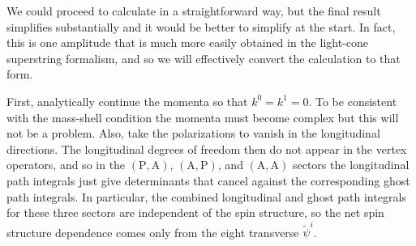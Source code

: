 We could proceed to calculate in a straightforward way, but the final result simplifies substantially and it would be better to simplify at the start. In fact, this is one amplitude that is much more easily obtained in the light-cone superstring formalism, and so we will effectively convert the calculation to that form.

First, analytically continue the momenta so that $k^0 = k^1 = 0$. To be consistent with the mass-shell condition the momenta must become complex but this will not be a problem. Also, take the polarizations to vanish in the longitudinal directions. The longitudinal degrees of freedom then do not appear in the vertex operators, and so in the $(\mathrm{P},\mathrm{A})$, $(\mathrm{A},\mathrm{P})$, and $(\mathrm{A},\mathrm{A})$ sectors the longitudinal path integrals just give determinants that cancel against the corresponding ghost path integrals. In particular, the combined longitudinal and ghost path integrals for these three sectors are independent of the spin structure, so the net spin structure dependence comes only from the eight transverse $\tilde{\psi}^i$.

